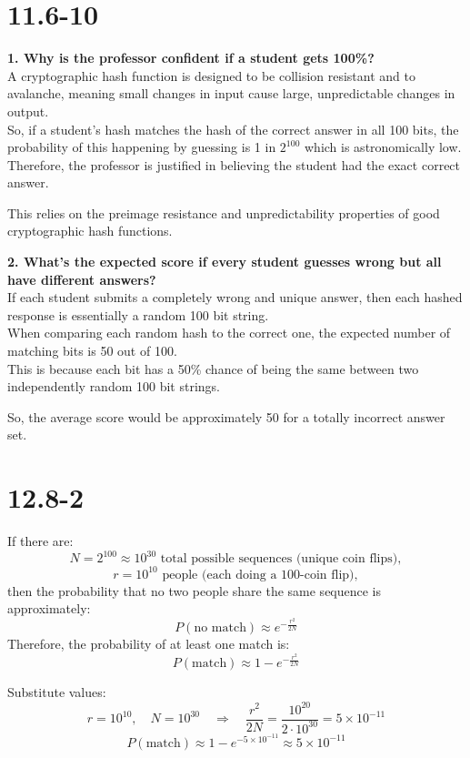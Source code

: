 \documentclass[12pt]{article}
\begin{document}
\section*{11.6-10}
\textbf{1. Why is the professor confident if a student gets 100\%?} \\
A cryptographic hash function is designed to be collision resistant and to avalanche, meaning small changes in input cause large, unpredictable changes in output. \\
So, if a student's hash matches the hash of the correct answer in all 100 bits, the probability of this happening by guessing is 1 in \( 2^{100} \) which is astronomically low. \\
Therefore, the professor is justified in believing the student had the exact correct answer.

This relies on the preimage resistance and unpredictability properties of good cryptographic hash functions.

\textbf{2. What's the expected score if every student guesses wrong but all have different answers?} \\
If each student submits a completely wrong and unique answer, then each hashed response is essentially a random 100 bit string. \\
When comparing each random hash to the correct one, the expected number of matching bits is 50 out of 100. \\
This is because each bit has a 50\% chance of being the same between two independently random 100 bit strings.

So, the average score would be approximately 50 for a totally incorrect answer set.
\newpage
\section*{12.8-2}
If there are:
\[
N = 2^{100} \approx 10^{30} \text{ total possible sequences (unique coin flips)},
\]
\[
r = 10^{10} \text{ people (each doing a 100-coin flip)},
\]
then the probability that no two people share the same sequence is approximately:
\[
P(\text{no match}) \approx e^{-\frac{r^2}{2N}}
\]
Therefore, the probability of at least one match is:
\[
P(\text{match}) \approx 1 - e^{-\frac{r^2}{2N}}
\]

Substitute values:
\[
r = 10^{10}, \quad N = 10^{30} \quad \Rightarrow \quad \frac{r^2}{2N} = \frac{10^{20}}{2 \cdot 10^{30}} = 5 \times 10^{-11}
\]
\[
P(\text{match}) \approx 1 - e^{-5 \times 10^{-11}} \approx 5 \times 10^{-11}
\]
\end{document}
